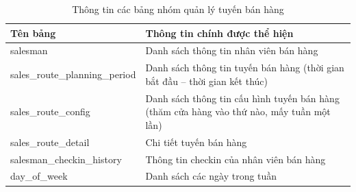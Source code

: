 \begin{table}[H]
\centering
\begin{tabular}{| m{6cm} | m{10cm} |}
\hline
\textbf{Tên bảng} & \textbf{Thông tin chính được thể hiện} \\
\hline
salesman &
Danh sách thông tin nhân viên bán hàng \\
\hline
sales\_route\_planning\_period &
Danh sách thông tin tuyến bán hàng
(thời gian bắt đầu – thời gian kết thúc) \\
\hline
sales\_route\_config &
Danh sách thông tin cấu hình tuyến bán hàng
(thăm cửa hàng vào thứ nào, mấy tuần một lần) \\
\hline
sales\_route\_detail &
Chi tiết tuyến bán hàng \\
\hline
salesman\_checkin\_history &
Thông tin checkin của nhân viên bán hàng  \\
\hline
day\_of\_week &
Danh sách các ngày trong tuần \\
\hline
\end{tabular}
\caption{Thông tin các bảng nhóm quản lý tuyến bán hàng}
\label{tab:dbsalesroute}
\end{table}
